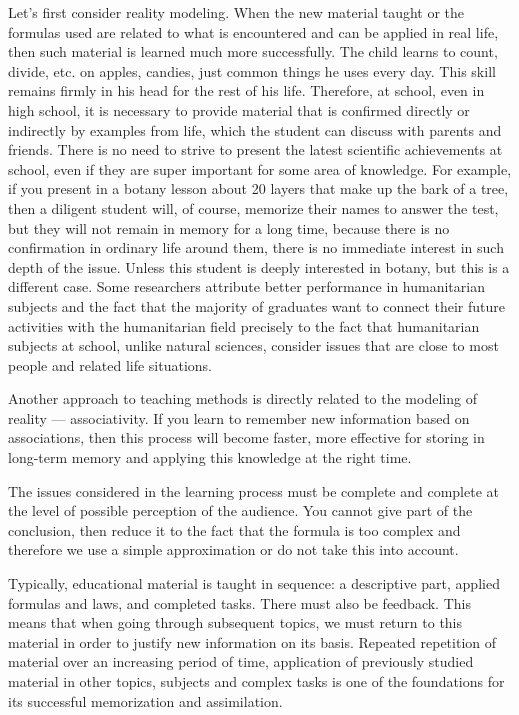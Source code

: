 \documentclass[10pt, a4paper]{article}
\begin{document}
\begin{multicols}{2}
        Let’s first consider reality modeling. When the new material taught or the formulas used are related to what is encountered and can be applied in real life, then such material is learned much more successfully. The child learns to count, divide, etc. on apples, candies, just common things he uses every day. This skill remains firmly in his head for the rest of his life. Therefore, at school, even in high school, it is necessary to provide material that is confirmed directly or indirectly by examples from life, which the student can discuss with parents and friends. There is no need to strive to present the latest scientific achievements at school, even if they are super important for some area of knowledge. For example, if you present in a botany lesson about 20 layers that make up the bark of a tree, then a diligent student will, of course, memorize their names to answer the test, but they will not remain in memory for a long time, because there is no confirmation in ordinary life around them, there is no immediate interest in such depth of the issue. Unless this student is deeply interested in botany, but this is a different case. Some researchers attribute better performance in humanitarian subjects and the fact that the majority of graduates want to connect their future activities with the humanitarian field precisely to the fact that humanitarian subjects at school, unlike natural sciences, consider issues that are close to most people and related life situations.

        Another approach to teaching methods is directly related to the modeling of reality — associativity. If you learn to remember new information based on associations, then this process will become faster, more effective for storing in long-term memory and applying this knowledge at the right time.
        
        The issues considered in the learning process must be complete and complete at the level of possible perception of the audience. You cannot give part of the conclusion, then reduce it to the fact that the formula is too complex and therefore we use a simple approximation or do not take this into account.

        Typically, educational material is taught in sequence: a descriptive part, applied formulas and laws, and completed tasks. There must also be feedback. This means that when going through subsequent topics, we must return to this material in order to justify new information on its basis. Repeated repetition of material over an increasing period of time, application of previously studied material in other topics, subjects and complex tasks is one of the foundations for its successful memorization and assimilation.


\end{multicols}
\end{document}
